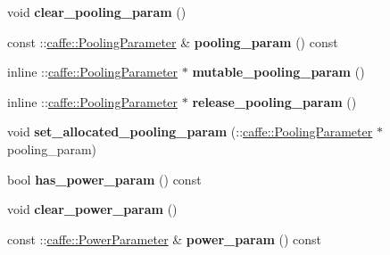 \begin{DoxyCompactItemize}
\item 
\mbox{\label{classcaffe_1_1_v1_layer_parameter_a7f36259cecea61ba9e7918642666679e}} 
void {\bfseries clear\+\_\+pooling\+\_\+param} ()
\item 
\mbox{\label{classcaffe_1_1_v1_layer_parameter_a45b2435b37e30250df243b4e5bdcc829}} 
const \+::\mbox{\hyperlink{classcaffe_1_1_pooling_parameter}{caffe\+::\+Pooling\+Parameter}} \& {\bfseries pooling\+\_\+param} () const
\item 
\mbox{\label{classcaffe_1_1_v1_layer_parameter_a8e5fefa390759400068af690d1f4556d}} 
inline \+::\mbox{\hyperlink{classcaffe_1_1_pooling_parameter}{caffe\+::\+Pooling\+Parameter}} $\ast$ {\bfseries mutable\+\_\+pooling\+\_\+param} ()
\item 
\mbox{\label{classcaffe_1_1_v1_layer_parameter_a097be6ea566567179b3937fb8c1f1dfe}} 
inline \+::\mbox{\hyperlink{classcaffe_1_1_pooling_parameter}{caffe\+::\+Pooling\+Parameter}} $\ast$ {\bfseries release\+\_\+pooling\+\_\+param} ()
\item 
\mbox{\label{classcaffe_1_1_v1_layer_parameter_a6b72b3c1dfd7142581b07d03fc73a9e9}} 
void {\bfseries set\+\_\+allocated\+\_\+pooling\+\_\+param} (\+::\mbox{\hyperlink{classcaffe_1_1_pooling_parameter}{caffe\+::\+Pooling\+Parameter}} $\ast$pooling\+\_\+param)
\item 
\mbox{\label{classcaffe_1_1_v1_layer_parameter_a6e8e04bd7ef784bfcfd0dc4599c19d61}} 
bool {\bfseries has\+\_\+power\+\_\+param} () const
\item 
\mbox{\label{classcaffe_1_1_v1_layer_parameter_a216d1604476c56a1770cea735de44e53}} 
void {\bfseries clear\+\_\+power\+\_\+param} ()
\item 
\mbox{\label{classcaffe_1_1_v1_layer_parameter_a80a65e0490e42a7999fccdd095e246a8}} 
const \+::\mbox{\hyperlink{classcaffe_1_1_power_parameter}{caffe\+::\+Power\+Parameter}} \& {\bfseries power\+\_\+param} () const
\item 

\end{DoxyCompactItemize}
